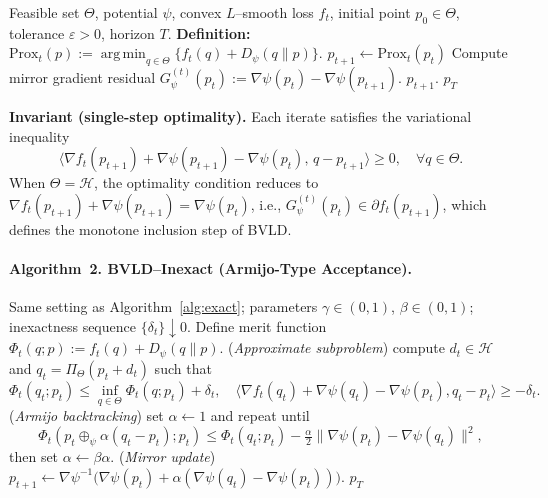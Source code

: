 \documentclass[11pt]{article}
\newcommand{\inner}[2]{\langle #1 , #2 \rangle}
\DeclareMathOperator*{\argmin}{arg\,min}
\theoremstyle{plain}
\theoremstyle{definition}
\theoremstyle{remark}
\begin{document}
\begin{algorithm}[!htbp]
\caption{Exact Bregman--Variational Update (BVLD--Exact)}
\label{alg:exact}
\begin{algorithmic}[1]
\Require Feasible set $\Theta$, potential $\psi$, convex $L$--smooth loss $f_t$, 
initial point $p_0\in\Theta$, tolerance $\varepsilon>0$, horizon $T$.
\Statex \textbf{Definition:} 
$\mathrm{Prox}_t(p):=\argmin_{q\in\Theta}\{f_t(q)+D_\psi(q\|p)\}$.
  \State $p_{t+1}\leftarrow\mathrm{Prox}_t(p_t)$ 
  \State Compute mirror gradient residual 
  $G_\psi^{(t)}(p_t):=\nabla\psi(p_t)-\nabla\psi(p_{t+1})$.
    \State \Return $p_{t+1}$.
  \EndIf
\EndFor
\State \Return $p_T$
\end{algorithmic}
\end{algorithm}

\noindent
\textbf{Invariant (single-step optimality).}  
Each iterate satisfies the variational inequality
\[
\langle\nabla f_t(p_{t+1})
+\nabla\psi(p_{t+1})
-\nabla\psi(p_t),\,q-p_{t+1}\rangle
\ge0,\quad\forall q\in\Theta.
\]
When $\Theta=\mathcal H$, the optimality condition reduces to 
$\nabla f_t(p_{t+1})+\nabla\psi(p_{t+1})=\nabla\psi(p_t)$,
i.e., $G_\psi^{(t)}(p_t)\in\partial f_t(p_{t+1})$,
which defines the monotone inclusion step of BVLD.

\paragraph{Algorithm~2. BVLD--Inexact (Armijo-Type Acceptance).}

\begin{algorithm}[!htbp]
\caption{Inexact Bregman--Variational Update with Armijo Rule (BVLD--Inexact)}
\label{alg:inexact}
\begin{algorithmic}[1]
\Require Same setting as Algorithm~\ref{alg:exact}; 
parameters $\gamma\in(0,1)$, $\beta\in(0,1)$; inexactness sequence $\{\delta_t\}\downarrow0$.
\State Define merit function $\Phi_t(q;p):=f_t(q)+D_\psi(q\|p)$.
  \State (\emph{Approximate subproblem})  
  compute $d_t\in\mathcal H$ and $q_t=\Pi_\Theta(p_t+d_t)$ such that
  \[
  \Phi_t(q_t;p_t)
  \le\inf_{q\in\Theta}\Phi_t(q;p_t)+\delta_t,
  \quad
  \inner{\nabla f_t(q_t)+\nabla\psi(q_t)-\nabla\psi(p_t)}{q_t-p_t}
  \ge-\delta_t.
  \]
  \State (\emph{Armijo backtracking})
  set $\alpha\leftarrow1$ and repeat until
  \[
  \Phi_t(p_t\oplus_\psi\alpha(q_t-p_t);p_t)
  \le\Phi_t(q_t;p_t)
  -\tfrac{\alpha}{2}\|\nabla\psi(p_t)-\nabla\psi(q_t)\|^2,
  \]
  then set $\alpha\leftarrow\beta\alpha$.
  \State (\emph{Mirror update})
  $p_{t+1}\leftarrow
  \nabla\psi^{-1}\!\big(\nabla\psi(p_t)
  +\alpha(\nabla\psi(q_t)-\nabla\psi(p_t))\big)$.
\EndFor
\State \Return $p_T$
\end{algorithmic}
\end{algorithm}
\end{document}
